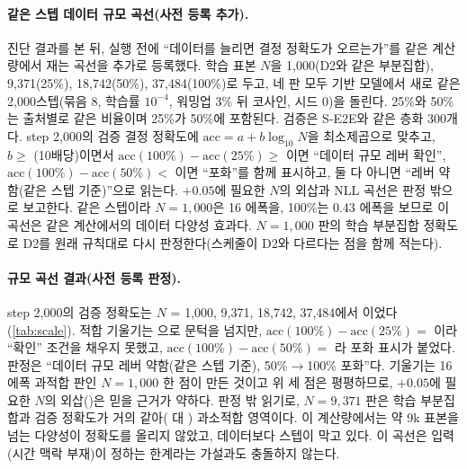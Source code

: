 \paragraph{같은 스텝 데이터 규모 곡선(사전 등록 추가).} 진단 결과를 본 뒤, 실행 전에 ``데이터를 늘리면 결정 정확도가 오르는가''를 같은 계산량에서 재는 곡선을 추가로 등록했다. 학습 표본 $N$을 1,000(D2와 같은 부분집합), 9,371(25\%), 18,742(50\%), 37,484(100\%)로 두고, 네 판 모두 기반 모델에서 새로 같은 2,000스텝(묶음 8, 학습률 $10^{-4}$, 워밍업 3\% 뒤 코사인, 시드 0)을 돌린다. 25\%와 50\%는 출처별로 같은 비율이며 25\%가 50\%에 포함된다. 검증은 S-E2E와 같은 층화 300개다. step 2,000의 검증 결정 정확도에 $\text{acc}=a+b\log_{10}N$을 최소제곱으로 맞추고, $b\ge$ (10배당)이면서 $\text{acc}(100\%)-\text{acc}(25\%)\ge$ 이면 ``데이터 규모 레버 확인'', $\text{acc}(100\%)-\text{acc}(50\%)<$ 이면 ``포화''를 함께 표시하고, 둘 다 아니면 ``레버 약함(같은 스텝 기준)''으로 읽는다. $+0.05$에 필요한 $N$의 외삽과 NLL 곡선은 판정 밖으로 보고한다. 같은 스텝이라 $N{=}1{,}000$은 16 에폭을, 100\%는 0.43 에폭을 보므로 이 곡선은 같은 계산에서의 데이터 다양성 효과다. $N{=}1{,}000$ 판의 학습 부분집합 정확도로 D2를 원래 규칙대로 다시 판정한다(스케줄이 D2와 다르다는 점을 함께 적는다).

\paragraph{규모 곡선 결과(사전 등록 판정).} step 2,000의 검증 정확도는 $N$ = 1,000, 9,371, 18,742, 37,484에서 이었다(\cref{tab:scale}). 적합 기울기는 으로 문턱을 넘지만, $\text{acc}(100\%)-\text{acc}(25\%)=$ 이라 ``확인'' 조건을 채우지 못했고, $\text{acc}(100\%)-\text{acc}(50\%)=$ 라 포화 표시가 붙었다. 판정은 ``데이터 규모 레버 약함(같은 스텝 기준), 50\%$\rightarrow$100\% 포화''다. 기울기는 16 에폭 과적합 판인 $N{=}1{,}000$ 한 점이 만든 것이고 위 세 점은 평평하므로, $+0.05$에 필요한 $N$의 외삽()은 믿을 근거가 약하다. 판정 밖 읽기로, $N{=}9{,}371$ 판은 학습 부분집합과 검증 정확도가 거의 같아( 대 ) 과소적합 영역이다. 이 계산량에서는 약 9k 표본을 넘는 다양성이 정확도를 올리지 않았고, 데이터보다 스텝이 막고 있다. 이 곡선은 입력(시간 맥락 부재)이 정하는 한계라는 가설과도 충돌하지 않는다.

